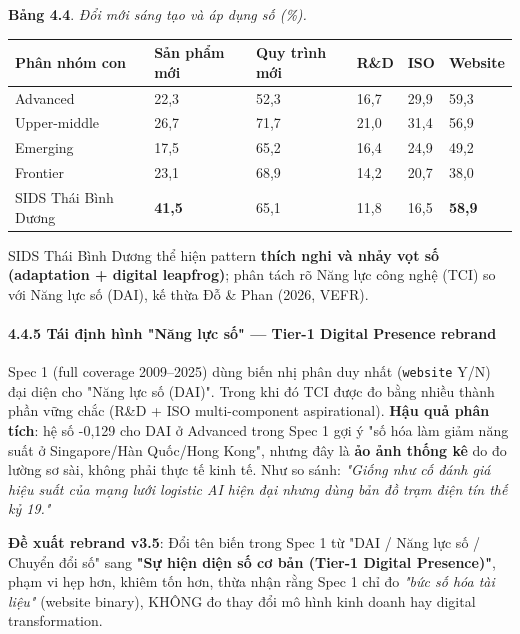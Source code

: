 \documentclass[12pt,a4paper]{article}
\begin{document}
\textbf{Bảng 4.4}. \emph{Đổi mới sáng tạo và áp dụng số (\%).}

\begin{longtable}[]{@{}llllll@{}}
\toprule\noalign{}
Phân nhóm con & Sản phẩm mới & Quy trình mới & R\&D & ISO & Website \\
\midrule\noalign{}
\endhead
\bottomrule\noalign{}
\endlastfoot
Advanced & 22,3 & 52,3 & 16,7 & 29,9 & 59,3 \\
Upper-middle & 26,7 & 71,7 & 21,0 & 31,4 & 56,9 \\
Emerging & 17,5 & 65,2 & 16,4 & 24,9 & 49,2 \\
Frontier & 23,1 & 68,9 & 14,2 & 20,7 & 38,0 \\
SIDS Thái Bình Dương & \textbf{41,5} & 65,1 & 11,8 & 16,5 &
\textbf{58,9} \\
\end{longtable}

SIDS Thái Bình Dương thể hiện pattern \textbf{thích nghi và nhảy vọt số
(adaptation + digital leapfrog)}; phân tách rõ Năng lực công nghệ (TCI)
so với Năng lực số (DAI), kế thừa Đỗ \& Phan (2026, VEFR).

\hypertarget{445-tuxe1i-ux111ux1ecbnh-huxecnh-nux103ng-lux1ef1c-sux1ed1--tier-1-digital-presence-rebrand}{%
\paragraph{4.4.5 Tái định hình "Năng lực số" --- Tier-1 Digital Presence
rebrand}\label{445-tuxe1i-ux111ux1ecbnh-huxecnh-nux103ng-lux1ef1c-sux1ed1--tier-1-digital-presence-rebrand}}

Spec 1 (full coverage 2009--2025) dùng biến nhị phân duy nhất
(\texttt{website} Y/N) đại diện cho "Năng lực số (DAI)". Trong khi đó
TCI được đo bằng nhiều thành phần vững chắc (R\&D + ISO multi-component
aspirational). \textbf{Hậu quả phân tích}: hệ số -0,129 cho DAI ở
Advanced trong Spec 1 gợi ý "số hóa làm giảm năng suất ở Singapore/Hàn
Quốc/Hong Kong", nhưng đây là \textbf{ảo ảnh thống kê} do đo lường sơ
sài, không phải thực tế kinh tế. Như so sánh: \emph{"Giống như cố đánh
giá hiệu suất của mạng lưới logistic AI hiện đại nhưng dùng bản đồ trạm
điện tín thế kỷ 19."}

\textbf{Đề xuất rebrand v3.5}: Đổi tên biến trong Spec 1 từ "DAI / Năng
lực số / Chuyển đổi số" sang \textbf{"Sự hiện diện số cơ bản (Tier-1
Digital Presence)"}, phạm vi hẹp hơn, khiêm tốn hơn, thừa nhận rằng Spec
1 chỉ đo \emph{"bức số hóa tài liệu"} (website binary), KHÔNG đo thay
đổi mô hình kinh doanh hay digital transformation.
\end{document}
